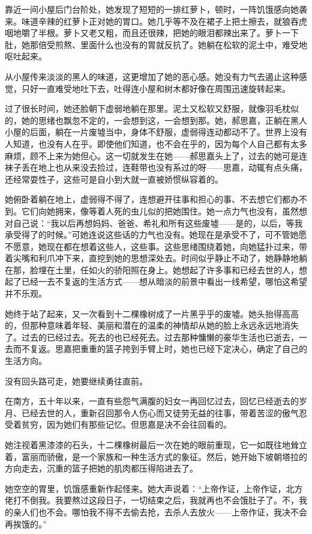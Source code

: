 \par 靠近一间小屋后门台阶处，她发现了短短的一排红萝卜，顿时，一阵饥饿感向她袭来。味道辛辣的红萝卜正对她的胃口。她几乎等不及在裙子上把土擦去，就狼吞虎咽地嚼了半根。萝卜又老又粗，而且还很辣，把她的眼泪都辣出来了。萝卜一下肚，她那倍受煎熬、里面什么也没有的胃就反抗了。她躺在松软的泥土中，难受地呕吐起来。
\par 从小屋传来淡淡的黑人的味道，这更增加了她的恶心感。她没有力气去遏止这种感觉，只好一直难受地吐下去，吐得连小屋和树木都好像在周围迅速旋转起来。
\par 过了很长时间，她还脸朝下虚弱地躺在那里。泥土又松软又舒服，就像羽毛枕似的，她的思绪也飘忽不定的，一会想到这，一会想到那。她，郝思嘉，正躺在黑人小屋的后面，躺在一片废墟当中，身体不舒服，虚弱得连动都动不了。世界上没有人知道，也没有人在乎。即使他们知道，也不会在乎的，因为每个人自己都有太多麻烦，顾不上来为她但心。这一切就发生在她——郝思嘉头上了，过去的她可是连袜子丢在地上也从来没去捡过，连鞋带也没有系过的呀——思嘉，动辄有点头痛，还经常耍性子，这些可是自小到大就一直被娇惯纵容着的。
\par 她俯卧着躺在地上，虚弱得不得了，连想避开往事和担心的事、不去想它们都办不到。它们向她拥来，像等着人死的虫儿似的把她围住。她一点力气也没有，虽然想对自己说：“我以后再想妈妈、爸爸、希礼和所有这些废墟——是的，以后，等我承受得了的时候。”可她连说这些话的力气也没有。她现在是承受不了，可不管她愿不愿意，她现在都在想着这些人，这些事。这些思绪围绕着她，向她猛扑过来，带着尖嘴和利爪冲下来，直挖到她的思想深处去。时间似乎静止不动了，她静静地躺在那，脸埋在土里，任如火的骄阳照在身上。她想起了许多事和已经去世的人，想起了已经一去不复返的生活方式——想从暗淡的前景中看出一线希望，哪怕这希望并不乐观。
\par 她终于站了起来，又一次看到十二棵橡树成了一片黑乎乎的废墟。她头抬得高高的，但那种意味着年轻、美丽和潜在的温柔的神情却从她的脸上永远永远地消失了。过去的已经过去。死去的也已经死去。过去那种慵懒的豪华生活也已逝去，一去而不复返。思嘉把重重的篮子挎到手臂上时，她也已经下定决心，确定了自己的生活方向。
\par 没有回头路可走，她要继续勇往直前。
\par 在南方，五十年以来，一直有些怨气满腹的妇女一再回忆过去，回忆已经逝去的岁月、已经去世的人，重新召回那令人伤心而又徒劳无益的往事，带着苦涩的傲气忍受着贫穷，因为她们有那些记忆。但思嘉是决不会往回看的。
\par 她注视着黑漆漆的石头，十二棵橡树最后一次在她的眼前重现，它一如既往地耸立着，富丽而骄傲，是一个家族和一种生活方式的象征。然后，她开始下坡朝塔拉的方向走去，沉重的篮子把她的肌肉都压得陷进去了。
\par 她空空的胃里，饥饿感重新作起怪来。她大声说着：“上帝作证，上帝作证，北方佬打不倒我。我要熬过这段日子，一切结束之后，我就再也不会饿肚子了。不，我的亲人们也不会。哪怕我不得不去偷去抢，去杀人去放火——上帝作证，我决不会再挨饿的。”

